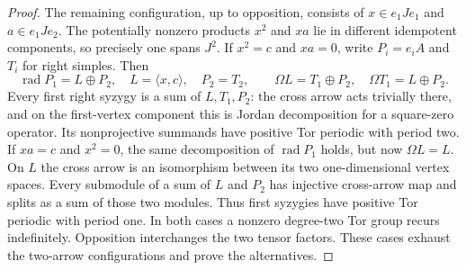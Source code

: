 \begin{proof}
The remaining configuration, up to opposition, consists
of $x\in e_1Je_1$ and $a\in e_1Je_2$.
The potentially nonzero products $x^2$ and $xa$
lie in different idempotent components, so precisely
one spans $J^2$.
If $x^2=c$ and $xa=0$, write $P_i=e_iA$ and
$T_i$ for right simples. Then
\[
 \operatorname{rad}P_1=L\oplus P_2,\quad
 L=\langle x,c\rangle,\quad P_2=T_2,\qquad
 \Omega L=T_1\oplus P_2,\quad
 \Omega T_1=L\oplus P_2.
\]
Every first right syzygy is a sum of $L,T_1,P_2$:
the cross arrow acts trivially there, and on the
first-vertex component this is Jordan decomposition
for a square-zero operator. Its nonprojective
summands have positive Tor periodic with period two.
If $xa=c$ and $x^2=0$, the same decomposition of
$\operatorname{rad}P_1$ holds, but now $\Omega L=L$.
On $L$ the cross arrow is an isomorphism between
its two one-dimensional vertex spaces. Every submodule
of a sum of $L$ and $P_2$ has injective cross-arrow
map and splits as a sum of those two modules.
Thus first syzygies have positive Tor periodic with
period one. In both cases a nonzero degree-two Tor
group recurs indefinitely. Opposition interchanges
the two tensor factors. These cases exhaust the
two-arrow configurations and prove the alternatives.
\end{proof}

